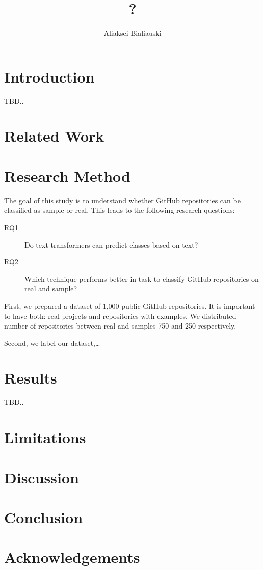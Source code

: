 \documentclass[sigplan,nonacm,review]{acmart}
\title{?}
\author{Aliaksei Bialiauski}
\affiliation{
    \institution{?}
    \city{Minsk}
    \country{Belarus}
}
\begin{document}
\maketitle


\section{Introduction}\label{sec:introduction}
TBD.. \citet{testCitation}


\section{Related Work}\label{sec:related}


\section{Research Method}\label{sec:method}
The goal of this study is to understand whether GitHub repositories can be
classified as sample or real. This leads to the following research questions:
\begin{description}
    \item[RQ1] Do text transformers can predict classes based on text?
    \item[RQ2] Which technique performs better in task to classify GitHub repositories on real and sample?
\end{description}

    First, we prepared a dataset of 1,000 public GitHub repositories.
    It is important to have both: real projects and repositories with examples.
    We distributed number of repositories between real and samples 750 and 250
    respectively.

    Second, we label our dataset,\ldots


\section{Results}\label{sec:results}
TBD..

\section{Limitations}\label{sec:limitations}


\section{Discussion}\label{sec:discussion}


\section{Conclusion}\label{sec:conclusion}


\section{Acknowledgements}\label{sec:acks}

{\raggedright

}
\vfill\eject
\end{document}
